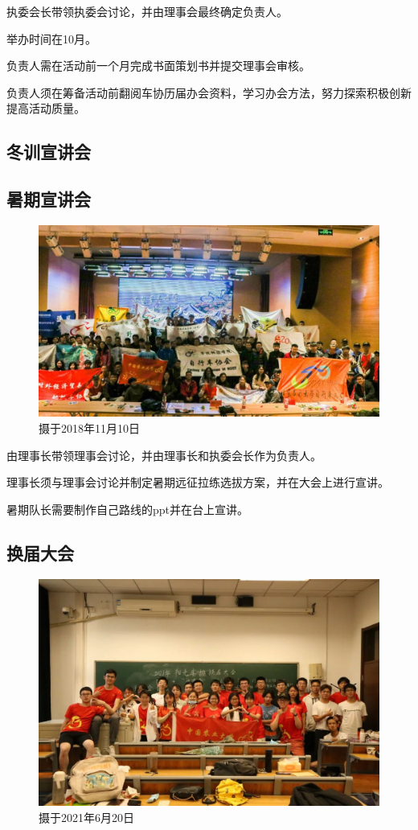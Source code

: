 \documentclass{ctexbook}
\begin{document}
执委会长带领执委会讨论，并由理事会最终确定负责人。

    举办时间在10月。

    负责人需在活动前一个月完成书面策划书并提交理事会审核。

    负责人须在筹备活动前翻阅车协历届办会资料，学习办会方法，努力探索积极创新提高活动质量。

\subsection{冬训宣讲会}


\subsection{暑期宣讲会}
\begin{figure}[H]
    \centering
    \includegraphics[width=0.7\linewidth]{fig/暑期报告会.jpg}
    \caption{摄于2018年11月10日}
    \label{fig:}
\end{figure}
   由理事长带领理事会讨论，并由理事长和执委会长作为负责人。

   理事长须与理事会讨论并制定暑期远征拉练选拔方案，并在大会上进行宣讲。

   暑期队长需要制作自己路线的ppt并在台上宣讲。
\subsection{换届大会}
\begin{figure}[H]
    \centering
    \includegraphics[width=0.7\linewidth]{fig/换届大会.jpg}
    \caption{摄于2021年6月20日}
    \label{fig:}
\end{figure}
\end{document}
